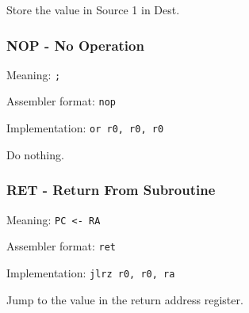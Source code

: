 \documentclass{article}
\begin{document}
Store the value in Source 1 in Dest.

\subsubsection{NOP - No Operation}
Meaning: \verb|;|

Assembler format: \verb|nop|

Implementation: \verb|or r0, r0, r0|

Do nothing.

\subsubsection{RET - Return From Subroutine}
Meaning: \verb|PC <- RA|

Assembler format: \verb|ret|

Implementation: \verb|jlrz r0, r0, ra|

Jump to the value in the return address register.
\end{document}

